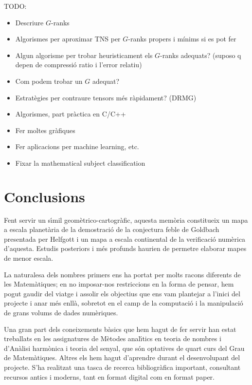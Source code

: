 \documentclass[11pt,a4paper,openright,oneside]{book}
\numberwithin{equation}{section}
\begin{document}
TODO:
\begin{itemize}
\item Descriure $G$-ranks
\item Algorismes per aproximar TNS per $G$-ranks propers i mínims si es pot fer
\item Algun algorisme per trobar heuristicament els $G$-ranks adequats? (suposo q depen de compressió ratio i l'error relatiu)
\item Com podem trobar un $G$ adequat?
\item Estratègies per contraure tensors més ràpidament? (DRMG)
\item Algorismes, part pràctica en C/C++
\item Fer moltes gràfiques
\item Fer aplicacions per machine learning, etc.
\item Fixar la mathematical subject classification
\end{itemize}












\chapter{Conclusions}

Fent servir un s\'{\i}mil geom\`etrico-cartogr\`afic, aquesta mem\`oria constitueix un mapa a escala planet\`aria de la demostraci\'o de la conjectura feble de Goldbach presentada per Helfgott i un mapa a escala continental de la verificaci\'o num\`erica d'aquesta. Estudis posteriors i m\'es profunds haurien de permetre elaborar mapes de menor escala.

La naturalesa dels nombres primers ens ha portat per molts racons diferents de les Matem\`atiques; en no imposar-nos restriccions en la forma de pensar, hem pogut gaudir del viatge i assolir els objectius que ens vam plantejar a l'inici del projecte i anar m\'es enll\`a, sobretot en el camp de la computaci\'o i la manipulaci\'o de grans volums de dades num\`eriques.

Una gran part dels coneixements b\`asics que hem hagut de fer servir han estat treballats en les assignatures de M\`etodes anal\'{\i}tics en teoria de nombres i d'An\`alisi harm\`onica i teoria del senyal, que s\'on optatives de quart curs del Grau de Ma\-te\-m\`a\-ti\-ques. Altres els hem hagut d'aprendre durant el desenvolupant del projecte. S'ha realitzat una tasca de recerca bibliogr\`afica important, consultant recursos antics i moderns, tant en format digital com en format paper.
\end{document}
